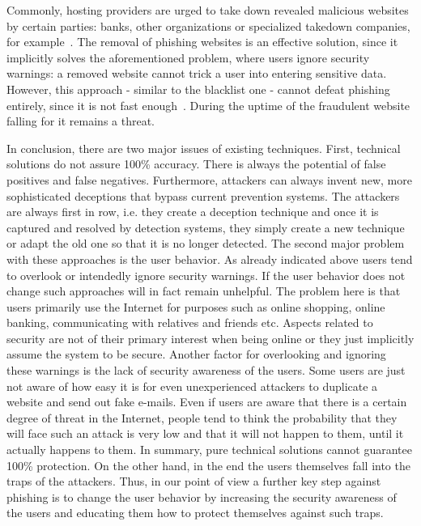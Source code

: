 \begin{description}[leftmargin=0cm]
	\item[Takedown] Commonly, hosting providers are urged to take down revealed malicious websites by certain parties: banks, other organizations or specialized takedown companies, for example~\cite{moore2007examining}. The removal of phishing websites is an effective solution, since it implicitly solves the aforementioned problem, where users ignore security warnings: a removed website cannot trick a user into entering sensitive data. However, this approach - similar to the blacklist one - cannot defeat phishing entirely, since it is not fast enough~\cite{moore2007examining}. During the uptime of the fraudulent website falling for it remains a threat.
\end{description}

In conclusion, there are two major issues of existing techniques. First, technical solutions do not assure 100\% accuracy. There is always the potential of false positives and false negatives. Furthermore, attackers can always invent new, more sophisticated deceptions that bypass current prevention systems. The attackers are always first in row, i.e. they create a deception technique and once it is captured and resolved by detection systems, they simply create a new technique or adapt the old one so that it is no longer detected. The second major problem with these approaches is the user behavior. As already indicated above users tend to overlook or intendedly ignore security warnings. If the user behavior does not change such approaches will in fact remain unhelpful. The problem here is that users primarily use the Internet for purposes such as online shopping, online banking, communicating with relatives and friends etc. Aspects related to  security are not of their primary interest when being online or they just implicitly assume the system to be secure. Another factor for overlooking and ignoring these warnings is the lack of security awareness of the users. Some users are just not aware of how easy it is for even unexperienced attackers to duplicate a website and send out fake e-mails. Even if users are aware that there is a certain degree of threat in the Internet, people tend to think the probability that they will face such an attack is very low and that it will not happen to them, until it actually happens to them. In summary, pure technical solutions cannot guarantee 100\% protection. On the other hand, in the end the users themselves fall into the traps of the attackers. Thus, in our point of view a further key step against phishing is to change the user behavior by increasing the security awareness of the users and educating them how to protect themselves against such traps.


